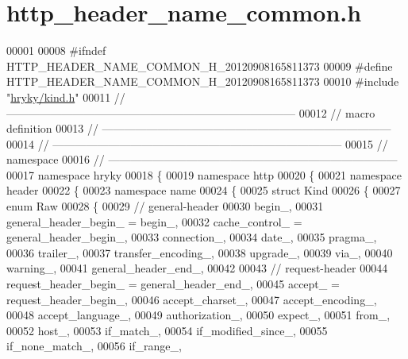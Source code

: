 \hypertarget{http__header__name__common_8h_source}{\section{http\-\_\-header\-\_\-name\-\_\-common.\-h}
}

\begin{DoxyCode}
00001 
00008 \textcolor{preprocessor}{#ifndef HTTP\_HEADER\_NAME\_COMMON\_H\_20120908165811373}
00009 \textcolor{preprocessor}{}\textcolor{preprocessor}{#define HTTP\_HEADER\_NAME\_COMMON\_H\_20120908165811373}
00010 \textcolor{preprocessor}{}\textcolor{preprocessor}{#include "\hyperlink{kind_8h}{hryky/kind.h}"}
00011 \textcolor{comment}{//
      ------------------------------------------------------------------------------}
00012 \textcolor{comment}{// macro definition}
00013 \textcolor{comment}{//
      ------------------------------------------------------------------------------}
00014 \textcolor{comment}{//
      ------------------------------------------------------------------------------}
00015 \textcolor{comment}{// namespace}
00016 \textcolor{comment}{//
      ------------------------------------------------------------------------------}
00017 \textcolor{keyword}{namespace }hryky
00018 \{
00019 \textcolor{keyword}{namespace }http
00020 \{
00021 \textcolor{keyword}{namespace }header
00022 \{
00023 \textcolor{keyword}{namespace }name
00024 \{
00025     \textcolor{keyword}{struct }Kind
00026     \{
00027         \textcolor{keyword}{enum} Raw
00028         \{
00029             \textcolor{comment}{// general-header}
00030             begin\_,
00031             general\_header\_begin\_   = begin\_,
00032             cache\_control\_          = general\_header\_begin\_,
00033             connection\_,
00034             date\_,
00035             pragma\_,
00036             trailer\_,
00037             transfer\_encoding\_,
00038             upgrade\_,
00039             via\_,
00040             warning\_,
00041             general\_header\_end\_,
00042 
00043             \textcolor{comment}{// request-header}
00044             request\_header\_begin\_   = general\_header\_end\_,
00045             accept\_                 = request\_header\_begin\_,
00046             accept\_charset\_,
00047             accept\_encoding\_,
00048             accept\_language\_,
00049             authorization\_,
00050             expect\_,
00051             from\_,
00052             host\_,
00053             if\_match\_,
00054             if\_modified\_since\_,
00055             if\_none\_match\_,
00056             if\_range\_,

\end{DoxyCode}
